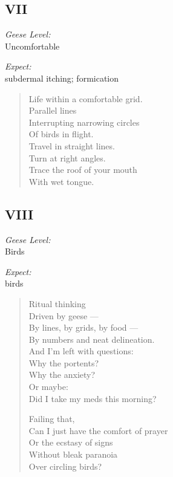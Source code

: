\subsection*{VII}
\noindent\begin{paracol}{2}
    \begin{flushright}
      \textit{Geese Level:}\\
      Uncomfortable

      \textit{Expect:}\\
      subdermal itching; formication
    \end{flushright}
    \switchcolumn
    \begin{verse}
      Life within a comfortable grid.\\
      Parallel lines\\
      \vin Interrupting narrowing circles\\
      \vin Of birds in flight.\\
      Travel in straight lines.\\
      Turn at right angles.\\
      Trace the roof of your mouth\\
      \vin With wet tongue.
    \end{verse}
\end{paracol}

\newpage

\subsection*{VIII}
\noindent\begin{paracol}{2}
    \begin{flushright}
      \textit{Geese Level:}\\
      Birds

      \textit{Expect:}\\
      birds
    \end{flushright}
    \switchcolumn
    \begin{verse}
      Ritual thinking\\
      \vin Driven by geese ---\\
      \vin By lines, by grids, by food ---\\
      \vin By numbers and neat delineation.\\
      And I'm left with questions:\\
      \vin Why the portents?\\
      \vin Why the anxiety?\\
      Or maybe:\\
      \vin Did I take my meds this morning?

      Failing that,\\
      \vin Can I just have the comfort of prayer\\
      \vin Or the ecstasy of signs\\
      \vin \vin Without bleak paranoia\\
      \vin \vin Over circling birds?
    \end{verse}
\end{paracol}

